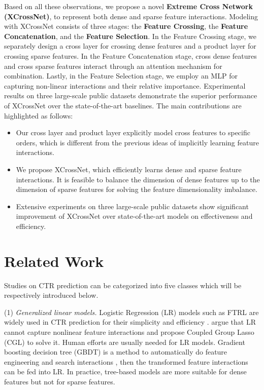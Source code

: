 \documentclass[letterpaper]{article} \usepackage{aaai21}  \usepackage{times}  \usepackage{helvet} \usepackage{courier}  \usepackage[hyphens]{url}  \usepackage{graphicx} \urlstyle{rm} \def\UrlFont{\rm}  \usepackage{natbib}  \usepackage{caption} \frenchspacing  \setlength{\pdfpagewidth}{8.5in}  \setlength{\pdfpageheight}{11in}  \usepackage{graphicx}
\begin{document}
Based on all these observations, we propose a novel \textbf{Extreme Cross Network (XCrossNet)}, to represent both dense and sparse feature interactions. Modeling with XCrossNet consists of three stages: the \textbf{Feature Crossing}, the \textbf{Feature Concatenation}, and the \textbf{Feature Selection}. In the Feature Crossing stage, we separately design a cross layer for crossing dense features and a product layer for crossing sparse features. In the Feature Concatenation stage, cross dense features and cross sparse features interact through an attention mechanism for combination. Lastly, in the Feature Selection stage, we employ an MLP for capturing non-linear interactions and their relative importance.
Experimental results on three large-scale public datasets demonstrate the superior performance of XCrossNet over the state-of-the-art baselines.
The main contributions are highlighted as follows:
\begin{itemize}
	\vspace{-0.1cm}
	\item  Our cross layer and product layer explicitly model cross features to specific orders, which is different from the previous ideas of implicitly learning feature interactions.
	\vspace{-0.1cm}
	\item We propose XCrossNet, which efficiently learns dense and sparse feature interactions. It is feasible to balance the dimension of dense features up to the dimension of sparse features for solving the feature dimensionality imbalance.\vspace{-0.1cm}
	\item Extensive experiments on three large-scale public datasets show significant improvement of XCrossNet over state-of-the-art models on effectiveness and efficiency.
\end{itemize}

\vspace{-0.4cm}
\section{Related Work}

Studies on CTR prediction can be categorized into five classes which will be respectively introduced below. 

(1) {\em Generalized linear models.} Logistic Regression (LR) models such as FTRL are widely used in CTR prediction for their simplicity and efficiency . \citeauthor{DBLP:conf/icml/YanLXH14} argue that LR cannot capture nonlinear feature interactions and propose Coupled Group Lasso (CGL) to solve it. Human efforts are usually needed for LR models. 
Gradient boosting decision tree (GBDT) is a method to automatically do feature engineering and search interactions \cite{friedman2001greedy}, then the transformed feature interactions can be fed into LR. In practice, tree-based models are more suitable for dense features but not for sparse features.
\end{document}

